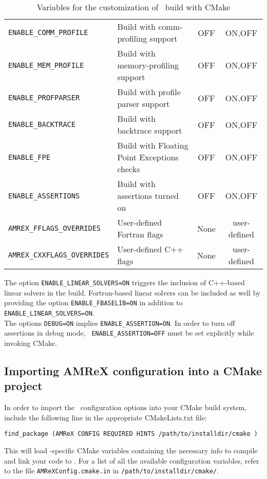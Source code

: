\begin{table}[h!]
{\begin{tabular}{llcc}
    {\tt ENABLE\_COMM\_PROFILE} &  Build with comm-profiling support & OFF  & ON,OFF \\
    {\tt ENABLE\_MEM\_PROFILE} &  Build with memory-profiling support & OFF  & ON,OFF \\
    {\tt ENABLE\_PROFPARSER} &  Build with profile parser support & OFF  & ON,OFF \\
    {\tt ENABLE\_BACKTRACE} & Build with backtrace support & OFF  & ON,OFF \\
    {\tt ENABLE\_FPE} & Build with Floating Point Exceptions checks & OFF  & ON,OFF \\
    {\tt ENABLE\_ASSERTIONS} & Build with assertions turned on  & OFF  & ON,OFF \\
    {\tt AMREX\_FFLAGS\_OVERRIDES} &  User-defined Fortran flags & None  & user-defined \\
    {\tt AMREX\_CXXFLAGS\_OVERRIDES} &  User-defined C++ flags & None  & user-defined \\
    \hline
  \end{tabular}
  }
  \caption{\label{tab:cmakevar} Variables for the customization of \amrex\ build with CMake}
\end{table}


The option {\tt ENABLE\_LINEAR\_SOLVERS=ON} triggers the inclusion of C++-based linear
solvers in the build. Fortran-based linear solvers can be included
as well by providing  the option {\tt ENABLE\_FBASELIB=ON} in addition
to  {\tt ENABLE\_LINEAR\_SOLVERS=ON}.\\
The options {\tt DEBUG=ON} implies {\tt ENABLE\_ASSERTION=ON}. In
order to turn off assertions in debug mode, {\tt
  ENABLE\_ASSERTION=OFF} must be set explicitly while invoking CMake.

\subsection{Importing AMReX configuration into a CMake project}
\label{sec:build:cmake:config}
In order to import the \amrex\ configuration options into your CMake
build system, include the following line in the appropriate
CMakeLists.txt file:
\begin{verbatim}
find_package (AMReX CONFIG REQUIRED HINTS /path/to/installdir/cmake )
\end{verbatim}
This will load \amrex-specific CMake variables containing the necessary
info to compile and link your code to \amrex. For a list of all the available
configuration variables, refer to the file {\tt AMReXConfig.cmake.in} in
{\tt /path/to/installdir/cmake/}.



